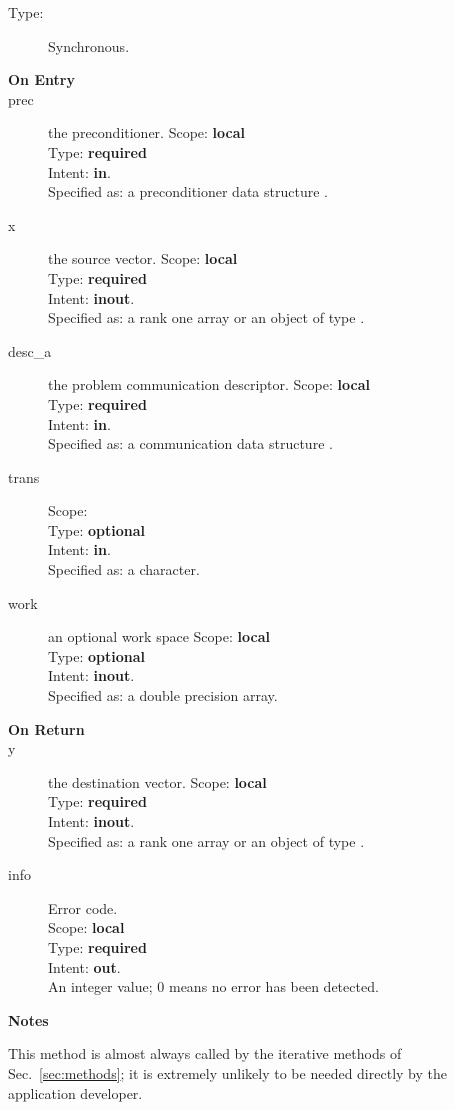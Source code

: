 \begin{description}
\item[Type:] Synchronous.
\item[\bf On Entry]
\item[prec] the preconditioner.
Scope: {\bf local} \\
Type: {\bf required}\\
Intent: {\bf in}.\\
Specified as: a preconditioner data structure \precdata.
\item[x] the source vector.
Scope: {\bf local} \\
Type: {\bf required}\\
Intent: {\bf inout}.\\
Specified as:  a rank one array or an object of type \vdata. 
\item[desc\_a] the problem communication descriptor.
Scope: {\bf local} \\
Type: {\bf required}\\
Intent: {\bf in}.\\
Specified as: a communication data structure \descdata.
\item[trans] 
Scope: {\bf } \\
Type: {\bf optional}\\
Intent: {\bf in}.\\
Specified as: a character.
\item[work] an optional work space
Scope: {\bf local} \\
Type: {\bf optional}\\
Intent: {\bf inout}.\\
Specified as: a double precision array.
\end{description}

\begin{description}
\item[\bf On Return]
\item[y] the destination vector.
Scope: {\bf local} \\
Type: {\bf required}\\
Intent: {\bf inout}.\\
Specified as:  a rank one array or an object of type \vdata.
\item[info] Error code.\\
Scope: {\bf local} \\
Type: {\bf required} \\
Intent: {\bf out}.\\
An integer value; 0 means no error has been detected. 
\end{description}
{\par\noindent\large\bfseries Notes}
This method is almost always called  by the iterative methods of
Sec.~\ref{sec:methods}; it is extremely unlikely to be needed directly
by the application developer.


